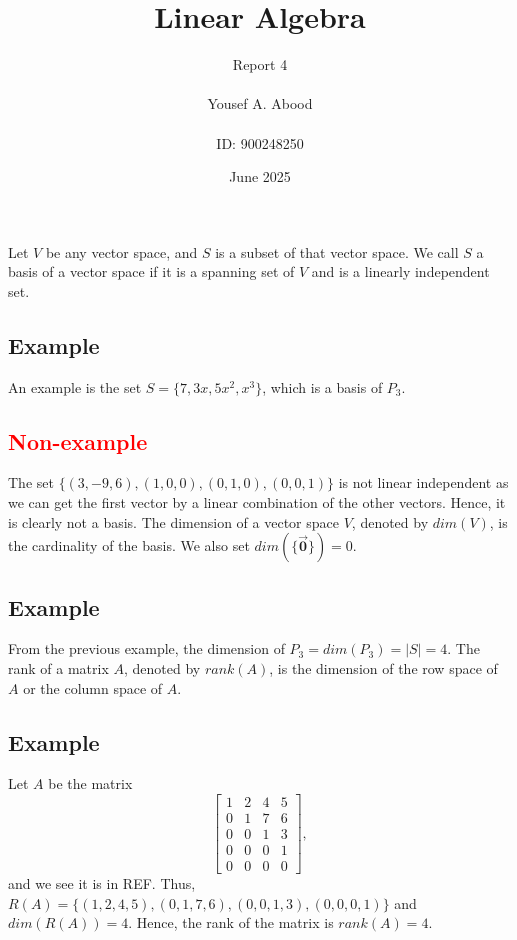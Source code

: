 \documentclass[12pt]{article}
\title{Linear Algebra}
\author{Report 4\\ \\ Yousef A. Abood\\ \\ ID: 900248250}
\date{June 2025}
\begin{document}
\maketitle
\noindent\makebox[\linewidth]{\rule{15cm}{0.4pt}}
{
    Let $V$ be any vector space, and $S$ is a subset of that vector space. We call $S$ a basis of a vector space if it is a spanning set of $V$ and is a linearly independent set.
}
\subsection*{{Example}}
An example is the set $S=\{7,3x, 5x^2,x^3\}$, which is a basis of $P_3$.
\subsection*{\textcolor{red}{Non-example}}
The set $\{(3,-9,6),(1,0,0),(0,1,0),(0,0,1)\}$ is not linear independent as we can get the first vector by a linear combination of the other vectors. Hence, it is clearly not a basis.
{
    The dimension of a vector space $V$, denoted by $dim(V)$, is the cardinality of the basis. We also set $dim(\{\vec{\textbf{0}}\})=0.$
}
\subsection*{{Example}}
From the previous example, the dimension of $P_3=dim(P_3)=|S|=4.$
{
    The rank of a matrix $A$, denoted by $rank(A)$, is the dimension of the row space of $A$ or the column space of $A$.
}
\subsection*{{Example}}
Let $A$ be the matrix
\[\begin{bmatrix}
    1&2&4&5\\
    0&1&7&6\\
    0&0&1&3\\
    0&0&0&1\\
    0&0&0&0
\end{bmatrix},\]
and we see it is in REF.
Thus, $R(A)=\{(1,2,4,5),(0,1,7,6),(0,0,1,3),(0,0,0,1)\}$ and $dim(R(A))=4.$ Hence, the rank of the matrix is $rank(A)=4.$ 
\end{document}

